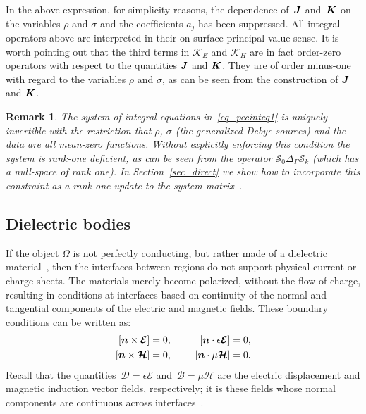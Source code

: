 \documentclass[11pt]{article}
\newcommand{\vct}{\vectorsym}
\newcommand{\surflap}{\Delta_\Gamma}
\newcommand{\bn}{\vct{ n}}
\newcommand{\bcB}{\bm{{\mathcal B}}}
\newcommand{\bcD}{\bm{{\mathcal D}}}
\newcommand{\bcE}{\bm{{\mathcal E}}}
\newcommand{\bcH}{\bm{\mathcal H}}
\newcommand{\bJ}{\vct{ J}}
\newcommand{\bK}{\vct{ K}}
\newcommand{\cS}{\mathcal S}
\newtheorem{remark}{\sffamily Remark}
\newcommand{\cK}{\mathcal K}
\numberwithin{equation}{section}
\begin{document}
In the above expression, for simplicity reasons,
the dependence of~$\bJ$ and~$\bK$ on the variables $\rho$ and $\sigma$
and the coefficients $a_j$ has been suppressed.
All integral operators above are interpreted in their on-surface
principal-value sense. It is worth pointing out that the third terms
in $\cK_E$ and $\cK_H$ are in fact order-zero operators with respect
to the quantities $\bJ$ and $\bK$. They are of order minus-one with regard
to the variables $\rho$ and $\sigma$, as can be seen from the
construction of $\bJ$ and $\bK$.

\begin{remark}
The system of integral equations in~\eqref{eq_pecinteq1} is uniquely
invertible with the restriction that $\rho$, $\sigma$ (the generalized
Debye sources) and the data are all mean-zero functions. Without
explicitly enforcing this condition the system is rank-one deficient,
as can be seen from the operator $\cS_0 \surflap \cS_k$ (which has a
null-space of rank one). In
Section~\ref{sec_direct} we show how to incorporate this
constraint as a rank-one update to the system
matrix~\cite{sifuentes_2015}.
\end{remark}




\subsection{Dielectric bodies}
\label{sec_dielectric}

If the object $\Omega$ is not perfectly conducting,
but rather made of a dielectric material~\cite{jackson}, 
then the interfaces between
regions do not support physical current or charge sheets. The
materials merely become polarized, without the flow of charge,
resulting in conditions at interfaces based on continuity of the
normal and tangential components of the electric and magnetic
fields. These boundary conditions can be written as:
\begin{equation}
  \begin{aligned}
    \left[ \bn \times \bcE \right] &= 0, &\qquad \left[ \bn \cdot
      \epsilon \bcE \right] &= 0, \\
    \left[ \bn \times \bcH \right] &= 0, & \left[ \bn \cdot
      \mu \bcH \right] &= 0.
  \end{aligned}
\end{equation}
Recall that the quantities~$\bcD=\epsilon\bcE$ and~$\bcB=\mu\bcH$ are
the electric displacement and magnetic induction vector fields,
respectively; it is these fields whose normal components are
continuous across interfaces~\cite{papas}.
\end{document}
